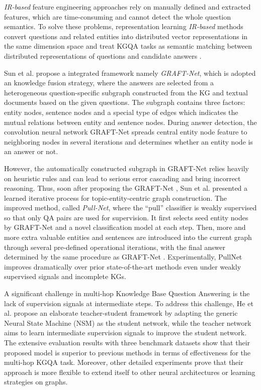 \documentclass[pdflatex,sn-mathphys]{sn-jnl}%
\theoremstyle{thmstyleone}%
\theoremstyle{thmstyletwo}%
\theoremstyle{thmstylethree}%
\begin{document}

\textit{IR-based} feature engineering approaches \cite{irfrmethod} rely on manually defined and extracted features, which are time-consuming and cannot detect the whole question semantics. To solve these problems, representation learning \textit{IR-based} methods convert questions and related entities into distributed vector representations in the same dimension space and treat KGQA tasks as semantic matching between distributed representations of questions and candidate answers \cite{fu2020surveyQA}. 

Sun et al. \cite{sun2018graftnet} propose a integrated framework namely \textit{GRAFT-Net}, which is adopted an knowledge fusion strategy, where the answers are selected from a heterogeneous question-specific subgraph constructed from the KG and textual documents based on the given questions. The subgraph contains three factors: entity nodes, sentence nodes and a special type of edges which indicates the mutual relations between entity and sentence nodes. During answer detection, the convolution neural network GRAFT-Net spreads central entity node feature to neighboring nodes in several iterations and determines whether an entity node is an answer or not.

However, the automatically constructed subgraph in GRAFT-Net relies heavily on heuristic rules and can lead to serious error cascading and bring incorrect reasoning. Thus, soon after proposing the GRAFT-Net \cite{sun2018graftnet}, Sun et al. \cite{pullnet} presented a learned iterative process for topic-entity-centric graph construction. The improved method, called \textit{Pull-Net}, where the ``pull'' classifier is weakly supervised so that only QA pairs are used for supervision. It first selects seed entity nodes by GRAFT-Net and a novel classification model at each step. Then, more and more extra valuable entities and sentences are introduced into the current graph through several pre-defined operational iterations, with the final answer determined by the same procedure as GRAFT-Net \cite{sun2018graftnet}. Experimentally, PullNet improves dramatically over prior state-of-the-art methods \cite{sun2018graftnet,jain2016fmnKGQA,irfrmethod} even under weakly supervised signals and incomplete KGs.

\textcolor[rgb]{1,0,0}{A significant challenge in multi-hop Knowledge Base Question Answering is the lack of supervision signals at intermediate steps. To address this challenge, He et al. \cite{he2021stu-teaQA} propose an elaborate teacher-student framework by adapting the generic Neural State Machine (NSM) \cite{nsm} as the student network, while the teacher network aims to learn intermediate supervision signals to improve the student network. The extensive evaluation results with three benchmark datasets show that their proposed model is superior to previous methods in terms of effectiveness for the multi-hop KGQA task. Moreover, other detailed experiments prove that their approach is more flexible to extend itself to other neural architectures or learning strategies on graphs.}
\end{document}
